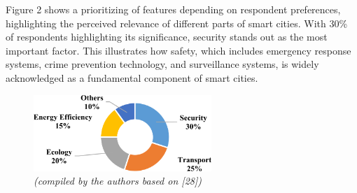 \begin{multicols}{2}
Figure 2 shows a prioritizing of features depending on respondent
preferences, highlighting the perceived relevance of different parts of
smart cities. With 30\% of respondents highlighting its significance,
security stands out as the most important factor. This illustrates how
safety, which includes emergency response systems, crime prevention
technology, and surveillance systems, is widely acknowledged as a
fundamental component of smart cities.
\end{multicols}

\begin{figure}[H]
	\centering
	\includegraphics[width=0.6\textwidth]{media/ekon/Graph_13}
	\caption*{Fig. 2 - Prioritizing of features depending on respondent preferences}
	\caption*{\normalfont \emph{(compiled by the authors based on {[}28{]})}}
\end{figure}

